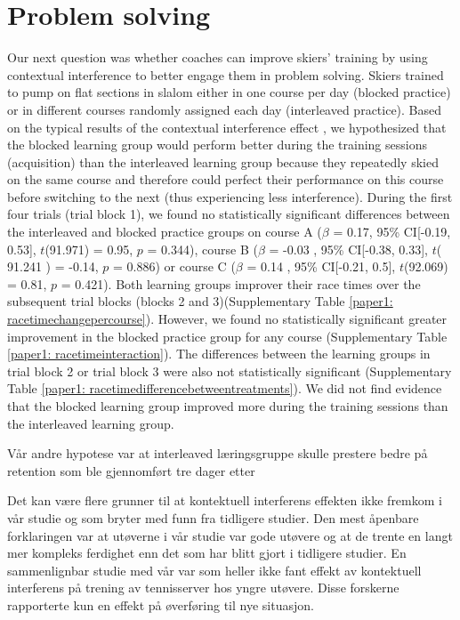 \section{Problem solving}
Our next question was whether coaches can improve skiers' training by using contextual interference to better engage them in problem solving. Skiers trained to pump on flat sections in slalom either in one course per day (blocked practice) or in different courses randomly assigned each day (interleaved practice). Based on the typical results of the contextual interference effect \cite{simon_metacognition_2001, shea_context_1983, hall_contextual_1994, shea_contextual_1979}, we hypothesized that the blocked learning group would perform better during the training sessions (acquisition) than the interleaved learning group because they repeatedly skied on the same course and therefore could perfect their performance on this course before switching to the next (thus experiencing less interference). During the first four trials (trial block 1), we found no statistically significant differences between the interleaved and blocked practice groups on course A ($\beta$ = 0.17, 95\% CI[-0.19, 0.53], $t$(91.971) = 0.95, $p$ =  0.344), course B ($\beta$ = -0.03 , 95\% CI[-0.38, 0.33], $t$( 91.241 ) = -0.14, $p$ = 0.886) or course C ($\beta$ = 0.14 , 95\% CI[-0.21, 0.5], $t$(92.069) = 0.81, $p$ = 0.421). Both learning groups improver their race times over the subsequent trial blocks (blocks 2 and 3)(Supplementary Table \ref{paper1: racetimechangepercourse}). However, we found no statistically significant greater improvement in the blocked practice group for any course (Supplementary Table \ref{paper1: racetimeinteraction}). The differences between the learning groups in trial block 2 or trial block 3 were also not statistically significant (Supplementary Table \ref{paper1: racetimedifferencebetweentreatments}). We did not find evidence that the blocked learning group improved more during the training sessions than the interleaved learning group. 

Vår andre hypotese var at interleaved læringsgruppe skulle prestere bedre på retention som ble gjennomført tre dager etter 






Det kan være flere grunner til at kontektuell interferens effekten ikke fremkom i vår studie og som bryter med funn fra tidligere studier. Den mest åpenbare forklaringen var at utøverne i vår studie var gode utøvere og at de trente en langt mer kompleks ferdighet enn det som har blitt gjort i tidligere studier. En sammenlignbar studie med vår var \cite{buszard_quantifying_2017} som heller ikke fant effekt av kontektuell interferens på trening av tennisserver hos yngre utøvere. Disse forskerne rapporterte kun en effekt på øverføring til nye situasjon. 






